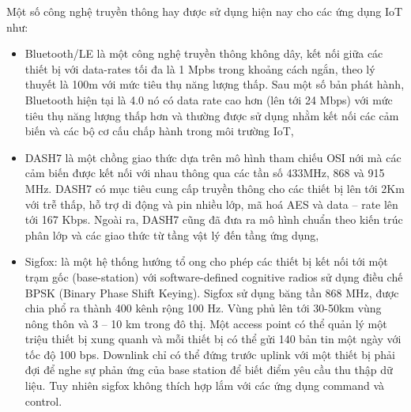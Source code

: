 Một số công nghệ truyền thông hay được sử dụng hiện nay cho các ứng dụng IoT như:
\begin{itemize}
\item	Bluetooth/LE là một công nghệ truyền thông không dây, kết nối giữa các thiết bị với data-rates tối đa là 1 Mpbs trong khoảng cách ngắn, theo lý thuyết là 100m với mức tiêu thụ năng lượng thấp. Sau một số bản phát hành, Bluetooth hiện tại là 4.0 nó có data rate cao hơn (lên tới 24 Mbps) với mức tiêu thụ năng lượng thấp hơn và thường được sử dụng nhằm kết nối các cảm biến và các bộ cơ cấu chấp hành trong môi trường IoT,
\item	DASH7 là một chồng giao thức dựa trên mô hình tham chiếu OSI nới mà các cảm biến được kết nối với nhau thông qua các tần số 433MHz, 868 và 915 MHz. DASH7 có mục tiêu cung cấp truyền thông cho các thiết bị lên tới 2Km với trễ thấp, hỗ trợ di động và pin nhiều lớp, mã hoá AES và data – rate lên tới 167 Kbps. Ngoài ra, DASH7 cũng đã đưa ra mô hình chuẩn theo kiến trúc phân lớp và các giao thức từ tầng vật lý đến tầng ứng dụng,
\item	Sigfox: là một hệ thống hướng tổ ong cho phép các thiết bị kết nối tới một trạm gốc (base-station) với software-deﬁned cognitive radios sử dụng điều chế BPSK (Binary Phase Shift Keying). Sigfox sử dụng băng tần 868 MHz, được chia phổ ra thành 400 kênh rộng 100 Hz. Vùng phủ lên tới 30-50km vùng nông thôn và 3 – 10 km trong đô thị. Một access point có thể quản lý một triệu thiết bị xung quanh và mỗi thiết bị có thể gửi 140 bản tin một ngày với tốc độ 100 bps. Downlink chỉ có thể đứng trước uplink với một thiết bị phải đợi để nghe sự phản ứng của base station để biết điểm yêu cầu thu thập dữ liệu. Tuy nhiên sigfox không thích hợp lắm với các ứng dụng command và control.
\end{itemize}

